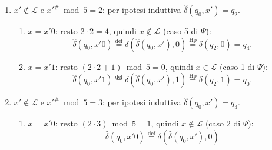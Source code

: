 \documentclass[a4paper, 11pt, oneside]{book}
\theoremstyle{formale}
\begin{document}
\begin{enumerate}
\begin{enumerate}[label=\arabic{enumi}\alph*.]
                \item $x = x'1$: resto $2 \cdot 1 + 1 = 3$, quindi $x \notin \mathcal{L}$
                    (caso 4 di $\Psi$):
                    \begin{equation*}
                        \hat{\delta}(q_0, x'1)
                        \overset{\text{def}}{=} \delta(\hat{\delta}(q_0, x'), 1)
                        \overset{\text{Hp}}{=} \delta(q_1, 1) = q_3.
                    \end{equation*}
            \end{enumerate}
        \item $x' \notin \mathcal{L}$ e $x'^\# \bmod 5 = 2$: per ipotesi induttiva
            $\hat{\delta}(q_0, x') = q_2$.
            \begin{enumerate}[label=\arabic{enumi}\alph*.]
                \item $x = x'0$: resto $2 \cdot 2 = 4$, quindi $x \notin \mathcal{L}$ (caso
                    5 di $\Psi$):
                    \begin{equation*}
                        \hat{\delta}(q_0, x'0)
                        \overset{\text{def}}{=} \delta(\hat{\delta}(q_0, x'), 0)
                        \overset{\text{Hp}}{=} \delta(q_2, 0) = q_4.
                    \end{equation*}
                \item $x = x'1$: resto $(2 \cdot 2 + 1) \bmod 5 = 0$, quindi
                    $x \in \mathcal{L}$ (caso 1 di $\Psi$):
                    \begin{equation*}
                        \hat{\delta}(q_0, x'1)
                        \overset{\text{def}}{=} \delta(\hat{\delta}(q_0, x'), 1)
                        \overset{\text{Hp}}{=} \delta(q_2, 1) = q_0.
                    \end{equation*}
            \end{enumerate}
        \item $x' \notin \mathcal{L}$ e $x'^\# \bmod 5 = 3$: per ipotesi induttiva
            $\hat{\delta}(q_0, x') = q_3$.
            \begin{enumerate}[label=\arabic{enumi}\alph*.]
                \item $x = x'0$: resto $(2 \cdot 3) \bmod 5 = 1$, quindi
                    $x \notin \mathcal{L}$ (caso 2 di $\Psi$):
                    \begin{equation*}
                        \hat{\delta}(q_0, x'0)
                        \overset{\text{def}}{=} \delta(\hat{\delta}(q_0, x'), 0)

\end{equation*}
\end{enumerate}
\end{enumerate}
\end{document}
